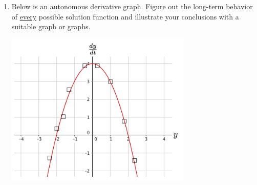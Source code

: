 \begin{enumerate}[resume]
\clearpage
\item	Below is an autonomous derivative graph. Figure out the long-term behavior of \underline{every} possible solution function and illustrate your conclusions with a suitable graph or graphs. \label{07problem10}
\begin{center}
\includegraphics[width=3.5in]{07/07Bugs2.png}
\end{center}

\end{enumerate}

\clearpage


